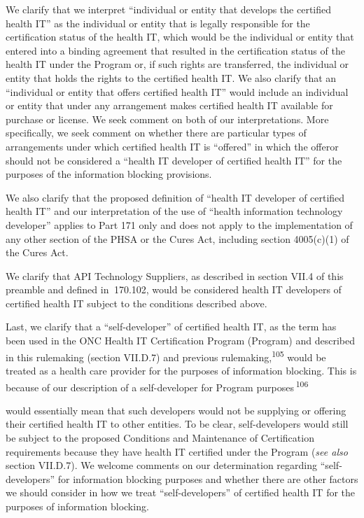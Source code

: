 \documentclass[twoside,11pt]{article}
\begin{document}
          We clarify that we interpret “individual or entity that develops the certified health IT” as the individual or entity that is legally responsible for the certification status of the health IT, which would be the individual or entity that entered into a binding agreement that resulted in the certification status of the health IT under the Program or, if such rights are transferred, the individual or entity that holds the rights to the certified health IT. We also clarify that an “individual or entity that offers certified health IT” would include an individual or entity that under any arrangement makes certified health IT available for purchase or license. We seek comment on both of our interpretations. More specifically, we seek comment on whether there are particular types of arrangements under which certified health IT is “offered” in which the offeror should not be considered a “health IT developer of certified health IT” for the purposes of the information blocking provisions.


          We also clarify that the proposed definition of “health IT developer of certified health IT” and our interpretation of the use of “health information technology developer” applies to Part 171 only and does not apply to the implementation of any other section of the PHSA or the Cures Act, including section 4005(c)(1) of the Cures Act.


          We clarify that API Technology Suppliers, as described in section VII.4 of this preamble and defined in \textsection{} 170.102, would be considered health IT developers of certified health IT subject to the conditions described above.


          Last, we clarify that a “self-developer” of certified health IT, as the term has been used in the ONC Health IT Certification Program (Program) and described in this rulemaking (section VII.D.7) and previous rulemaking,\textsuperscript{105}
             would be treated as a health care provider for the purposes of information blocking. This is because of our description of a self-developer for Program purposes \textsuperscript{106}

             would essentially mean that such developers would not be supplying or offering their certified health IT to other entities. To be clear, self-developers would still be subject to the proposed Conditions and  \ifhmode\expandafter\xspace\fi Maintenance of Certification requirements because they have health IT certified under the Program (\emph{see also} section VII.D.7). We welcome comments on our determination regarding “self-developers” for information blocking purposes and whether there are other factors we should consider in how we treat “self-developers” of certified health IT for the purposes of information blocking.
\end{document}
